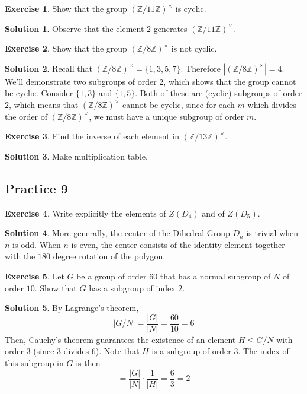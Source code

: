 \documentclass[12pt]{article}
\theoremstyle{definition}
\newcommand{\Z}{\mathbb{Z}}
\newtheorem{exercise}{\color{YellowOrange}Exercise}
\theoremstyle{definition}
\newtheorem{solution}{\color{Goldenrod}Solution}
\begin{document}
 \begin{exercise}
 	Show that the group $(\Z / 11 \Z)^{\times}$ is cyclic.
 \end{exercise}
 \begin{solution}
 	Observe that the element $2$ generates $(\Z / 11 \Z)^{\times}$.
 \end{solution}

 \begin{exercise}
	 Show that the group $(\Z / 8 \Z)^{\times}$ is not cyclic.
 \end{exercise}
 \begin{solution}
 	Recall that $(\Z / 8 \Z)^{\times} = \{1,3,5,7\}$. Therefore $|(\Z / 8 \Z)^{\times}| = 4$. We'll demonstrate two subgroups of order $2$, which shows that the group cannot be cyclic. Consider $\{1,3\}$ and $\{1,5\}$. Both of these are (cyclic) subgroups of order $2$, which means that $(\Z / 8 \Z)^{\times}$ cannot be cyclic, since for each $m$ which divides the order of $(\Z / 8 \Z)^{\times}$, we must have a unique subgroup of order $m$. 
 \end{solution}

 \begin{exercise}
 	Find the inverse of each element in $(\Z / 13 \Z)^{\times}$. 
 \end{exercise}
 \begin{solution}
 	Make multiplication table. 
 \end{solution}

\subsection{Practice 9}
\begin{exercise}
Write explicitly the elements of $Z(D_4)$ and of $Z(D_5)$.
\end{exercise}
\begin{solution}
More generally, the center of the Dihedral Group $D_n$ is trivial when $n$ is odd. When $n$ is even, the center consists of the identity element together with the $180$ degree rotation of the polygon.
\end{solution}

\begin{exercise}
	Let $G$ be a group of order 60 that has a normal subgroup of $N$ of order $10$. Show that $G$ has a subgroup of index $2$.
\end{exercise}
\begin{solution} \color{Red}{(Sketchy)}
	\color{Black}
	By Lagrange's theorem,
	\begin{equation}
		\vert G/ N \vert = \frac{|G|}{|N|} = \frac{60}{10} = 6
	\end{equation}
	Then, Cauchy's theorem guarantees the existence of an element $H \leq G/N$ with order $3$ (since 3 divides 6).  Note that $H$ is a subgroup of order $3$. The index of this subgroup in $G$ is then
	\begin{equation}
		[G/N:H] = \frac{|G|}{|N|} \cdot \frac{1}{|H|} = \frac{6}{3} = 2
	\end{equation}
\end{solution}
\end{document}

